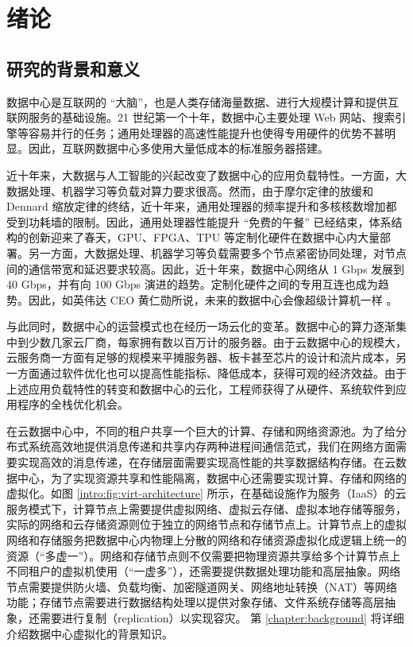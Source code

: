 \chapter{绪论}
\label{chapter:intro}

\section{研究的背景和意义}


数据中心是互联网的 ``大脑''，也是人类存储海量数据、进行大规模计算和提供互联网服务的基础设施。21 世纪第一个十年，数据中心主要处理 Web 网站、搜索引擎等容易并行的任务；通用处理器的高速性能提升也使得专用硬件的优势不甚明显。因此，互联网数据中心多使用大量低成本的标准服务器搭建。

近十年来，大数据与人工智能的兴起改变了数据中心的应用负载特性。一方面，大数据处理、机器学习等负载对算力要求很高。然而，由于摩尔定律的放缓和 Dennard 缩放定律的终结，近十年来，通用处理器的频率提升和多核核数增加都受到功耗墙的限制。因此，通用处理器性能提升 ``免费的午餐'' 已经结束，体系结构的创新迎来了春天，GPU、FPGA、TPU 等定制化硬件在数据中心内大量部署。另一方面，大数据处理、机器学习等负载需要多个节点紧密协同处理，对节点间的通信带宽和延迟要求较高。因此，近十年来，数据中心网络从 1 Gbps 发展到 40 Gbps，并有向 100 Gbps 演进的趋势。定制化硬件之间的专用互连也成为趋势。因此，如英伟达 CEO 黄仁勋所说，未来的数据中心会像超级计算机一样 \cite{nvidia-datacenter}。

与此同时，数据中心的运营模式也在经历一场云化的变革。数据中心的算力逐渐集中到少数几家云厂商，每家拥有数以百万计的服务器。由于云数据中心的规模大，云服务商一方面有足够的规模来平摊服务器、板卡甚至芯片的设计和流片成本，另一方面通过软件优化也可以提高性能指标、降低成本，获得可观的经济效益。由于上述应用负载特性的转变和数据中心的云化，工程师获得了从硬件、系统软件到应用程序的全栈优化机会。

在云数据中心中，不同的租户共享一个巨大的计算、存储和网络资源池。为了给分布式系统高效地提供消息传递和共享内存两种进程间通信范式，我们在网络方面需要实现高效的消息传递，在存储层面需要实现高性能的共享数据结构存储。在云数据中心，为了实现资源共享和性能隔离，数据中心还需要实现计算、存储和网络的虚拟化。如图 \ref{intro:fig:virt-architecture} 所示，在基础设施作为服务（IaaS）的云服务模式下，计算节点上需要提供虚拟网络、虚拟云存储、虚拟本地存储等服务，实际的网络和云存储资源则位于独立的网络节点和存储节点上。计算节点上的虚拟网络和存储服务把数据中心内物理上分散的网络和存储资源虚拟化成逻辑上统一的资源（``多虚一''）。网络和存储节点则不仅需要把物理资源共享给多个计算节点上不同租户的虚拟机使用（``一虚多''），还需要提供数据处理功能和高层抽象。网络节点需要提供防火墙、负载均衡、加密隧道网关、网络地址转换（NAT）等网络功能；存储节点需要进行数据结构处理以提供对象存储、文件系统存储等高层抽象，还需要进行复制（replication）以实现容灾。
第 \ref{chapter:background} 将详细介绍数据中心虚拟化的背景知识。


